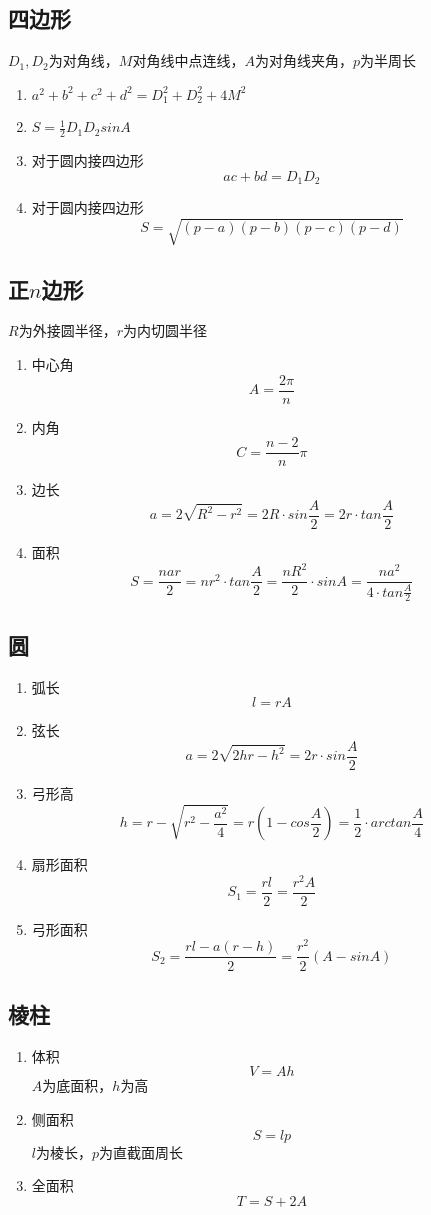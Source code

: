 	\subsection{四边形}
		$D_1, D_2$为对角线，$M$对角线中点连线，$A$为对角线夹角，$p$为半周长
		\begin{enumerate}
			\item $a^2+b^2+c^2+d^2=D_1^2+D_2^2+4M^2$
			\item $S=\frac{1}{2}D_1D_2sinA$
			\item 对于圆内接四边形
				$$ac+bd=D_1D_2$$
			\item 对于圆内接四边形
				$$S=\sqrt{(p-a)(p-b)(p-c)(p-d)}$$
		\end{enumerate}
	\subsection{正$n$边形}
		$R$为外接圆半径，$r$为内切圆半径
		\begin{enumerate}
			\item 中心角
				$$A=\frac{2\pi}{n}$$
			\item 内角
				$$C=\frac{n-2}{n}\pi$$
			\item 边长
				$$a=2\sqrt{R^2-r^2}=2R \cdot sin\frac{A}{2}=2r \cdot tan\frac{A}{2}$$
			\item 面积
				$$S=\frac{nar}{2}=nr^2 \cdot tan\frac{A}{2}=\frac{nR^2}{2} \cdot sinA=\frac{na^2}{4 \cdot tan\frac{A}{2}}$$
		\end{enumerate}
	\subsection{圆}
		\begin{enumerate}
			\item 弧长
				$$l=rA$$
			\item 弦长
				$$a=2\sqrt{2hr-h^2}=2r\cdot sin\frac{A}{2}$$
			\item 弓形高
				$$h=r-\sqrt{r^2-\frac{a^2}{4}}=r(1-cos\frac{A}{2})=\frac{1}{2} \cdot arctan\frac{A}{4}$$
			\item 扇形面积
				$$S_1=\frac{rl}{2}=\frac{r^2A}{2}$$
			\item 弓形面积
				$$S_2=\frac{rl-a(r-h)}{2}=\frac{r^2}{2}(A-sinA)$$
		\end{enumerate}
	\subsection{棱柱}
		\begin{enumerate}
			\item 体积
				$$V=Ah$$
				$A$为底面积，$h$为高
			\item 侧面积
				$$S=lp$$
				$l$为棱长，$p$为直截面周长
			\item 全面积
				$$T=S+2A$$
		\end{enumerate}
